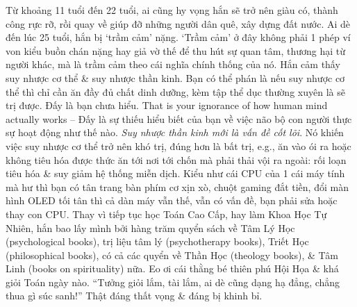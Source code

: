 \documentclass[12pt]{article}
\begin{document}
Từ khoảng 11 tuổi đến 22 tuổi, ai cũng hy vọng hắn sẽ trở nên giàu có, thành công rực rỡ, rồi quay về giúp đỡ những người dân quê, xây dựng đất nước. Ai dè đến lúc 25 tuổi, hắn bị `trầm cảm' nặng. `Trầm cảm' ở đây không phải 1 phép ví von kiểu buồn chán nặng hay giả vờ thế để thu hút sự quan tâm, thương hại từ người khác, mà là trầm cảm theo cái nghĩa chính thống của nó. Hắn cảm thấy suy nhược cơ thể \& suy nhược thần kinh. Bạn có thể phán là nếu suy nhược cơ thể thì chỉ cần ăn đầy đủ chất dinh dưỡng, kèm tập thể dục thường xuyên là sẽ trị được. Đấy là bạn chưa hiểu. That is your ignorance of how human mind actually works -- Đấy là sự thiếu hiểu biết của bạn về việc não bộ con người thực sự hoạt động như thế nào. {\it Suy nhược thần kinh mới là vấn đề cốt lõi}. Nó khiến việc suy nhược cơ thể trở nên khó trị, đúng hơn là bất trị, e.g., ăn vào ói ra hoặc không tiêu hóa được thức ăn tới nơi tới chốn mà phải thải vội ra ngoài: rối loạn tiêu hóa \& suy giảm hệ thống miễn dịch. Kiểu như cái CPU của 1 cái máy tính mà hư thì bạn có tân trang bàn phím cơ xịn xò, chuột gaming đắt tiền, đổi màn hình OLED tối tân thì cả dàn máy vẫn thế, vẫn có vấn đề, bạn phải sửa hoặc thay con CPU. Thay vì tiếp tục học Toán Cao Cấp, hay làm Khoa Học Tự Nhiên, hắn bao lấy mình bởi hàng trăm quyển sách về Tâm Lý Học (psychological books), trị liệu tâm lý (psychotherapy books), Triết Học (philosophical books), có cả các quyển về Thần Học (theology books), \& Tâm Linh (books on spirituality) nữa. Eo ơi cái thằng bé thiên phú Hội Họa \& khá giỏi Toán ngày nào. ``Tưởng giỏi lắm, tài lắm, ai dè cũng dạng hạ đẳng, chẳng thua gì súc sanh!'' Thật đáng thất vọng \& đáng bị khinh bỉ.
\end{document}
